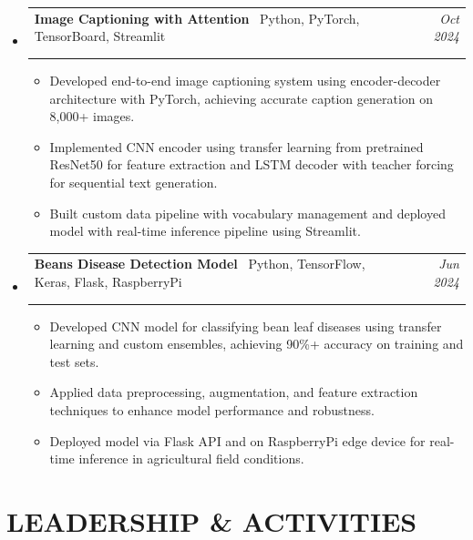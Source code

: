 \documentclass[11pt,a4paper]{article}
\makeatletter
\newcommand{\resumeProjectHeading}[4]{
  \vspace{2pt}
  \item[]
    \begin{tabular*}{\textwidth}[t]{@{\hspace{0pt}}p{0.82\textwidth}@{\extracolsep{\fill}}r}
      \textbf{#1} {\small\textbar\ #2} & \textit{#3} \\
      \if\relax\detokenize{#4}\relax\else
        \multicolumn{2}{l}{\footnotesize\color{gray!70}\faGithub\ \href{#4}{#4}} \\
      \fi
    \end{tabular*}
  \vspace{-8pt}
}
\makeatother
\begin{document}
\begin{itemize}[leftmargin=0pt, label={}]
\resumeProjectHeading
    {Image Captioning with Attention}{Python, PyTorch, TensorBoard, Streamlit}{Oct 2024}{https://github.com/DejusDevspace/image-captioning}
  \begin{itemize}[leftmargin=15pt, label=\textbullet]
    \item Developed end-to-end image captioning system using encoder-decoder architecture with PyTorch, achieving accurate caption generation on 8,000+ images.
    \item Implemented CNN encoder using transfer learning from pretrained ResNet50 for feature extraction and LSTM decoder with teacher forcing for sequential text generation.
    \item Built custom data pipeline with vocabulary management and deployed model with real-time inference pipeline using Streamlit.
  \end{itemize}

\resumeProjectHeading
  {Beans Disease Detection Model}{Python, TensorFlow, Keras, Flask, RaspberryPi}{Jun 2024}{https://github.com/DejusDevspace/bean-disease-classification}
  \begin{itemize}[leftmargin=15pt, label=\textbullet]
    \item Developed CNN model for classifying bean leaf diseases using transfer learning and custom ensembles, achieving 90\%+ accuracy on training and test sets.
    \item Applied data preprocessing, augmentation, and feature extraction techniques to enhance model performance and robustness.
    \item Deployed model via Flask API and on RaspberryPi edge device for real-time inference in agricultural field conditions.
  \end{itemize}

\end{itemize}

\section{LEADERSHIP \& ACTIVITIES}
\end{document}
